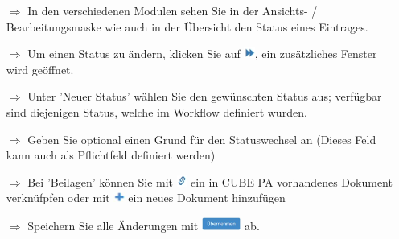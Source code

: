 \documentclass{article}
\begin{document}
\begin{multicols}{2}
\begin{tcolorbox}[colback=blue!5,colframe=blue!40!black,title=Workflows anwenden]
\begin{itemize}
  \item[$\Longrightarrow$] In den verschiedenen Modulen sehen Sie in der Ansichts- / Bearbeitungsmaske wie auch in der Übersicht den Status eines Eintrages.
  \item[$\Longrightarrow$] Um einen Status zu ändern, klicken Sie auf \includegraphics[height=10pt]{Icons/Status_Aendern.jpg}, ein zusätzliches Fenster wird geöffnet.
  \item[$\Longrightarrow$] Unter 'Neuer Status' wählen Sie den gewünschten Status aus; verfügbar sind diejenigen Status, welche im Workflow definiert wurden.
	\item[$\Longrightarrow$] Geben Sie optional einen Grund für den Statuswechsel an (Dieses Feld kann auch als Pflichtfeld definiert werden)
	\item[$\Longrightarrow$] Bei 'Beilagen' können Sie mit \includegraphics[height=10pt]{Icons/Link.jpg} ein in CUBE PA vorhandenes Dokument verknüfpfen oder mit \includegraphics[height=10pt]{Icons/Pluszeichen.jpg} ein neues Dokument hinzufügen
	\item[$\Longrightarrow$] Speichern Sie alle Änderungen mit \includegraphics[height=12pt]{Icons/B_Uebernehmen.jpg} ab.
\end{itemize}
\end{tcolorbox}


\end{multicols}




\pagebreak
{}

\vspace{\baselineskip}
\end{document}
